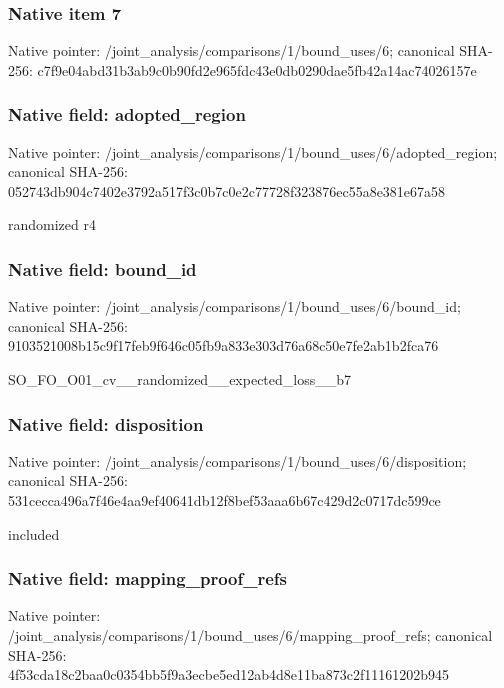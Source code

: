 \documentclass[10pt,a4paper]{article}
\begin{document}
\subsubsection{Native item 7}
Native pointer: /joint\_\allowbreak{}analysis/comparisons/1/bound\_\allowbreak{}uses/6; canonical SHA-256: c7f9e04abd31b3ab9c0b90fd2e965fdc43e0db0290dae5fb42a14ac74026157e

\subsubsection{Native field: adopted\_\allowbreak{}region}
Native pointer: /joint\_\allowbreak{}analysis/comparisons/1/bound\_\allowbreak{}uses/6/adopted\_\allowbreak{}region; canonical SHA-256: 052743db904c7402e3792a517f3c0b7c0e2c77728f323876ec55a8e381e67a58

\begingroup\raggedright\sloppy randomized r4\par\endgroup

\subsubsection{Native field: bound\_\allowbreak{}id}
Native pointer: /joint\_\allowbreak{}analysis/comparisons/1/bound\_\allowbreak{}uses/6/bound\_\allowbreak{}id; canonical SHA-256: 9103521008b15c9f17feb9f646c05fb9a833e303d76a68c50e7fe2ab1b2fca76

\begingroup\raggedright\sloppy SO\_\allowbreak{}FO\_\allowbreak{}O01\_\allowbreak{}cv\_\allowbreak{}\_\allowbreak{}randomized\_\allowbreak{}\_\allowbreak{}expected\_\allowbreak{}loss\_\allowbreak{}\_\allowbreak{}b7\par\endgroup

\subsubsection{Native field: disposition}
Native pointer: /joint\_\allowbreak{}analysis/comparisons/1/bound\_\allowbreak{}uses/6/disposition; canonical SHA-256: 531cecca496a7f46e4aa9ef40641db12f8bef53aaa6b67c429d2c0717dc599ce

\begingroup\raggedright\sloppy included\par\endgroup

\subsubsection{Native field: mapping\_\allowbreak{}proof\_\allowbreak{}refs}
Native pointer: /joint\_\allowbreak{}analysis/comparisons/1/bound\_\allowbreak{}uses/6/mapping\_\allowbreak{}proof\_\allowbreak{}refs; canonical SHA-256: 4f53cda18c2baa0c0354bb5f9a3ecbe5ed12ab4d8e11ba873c2f11161202b945
\end{document}
